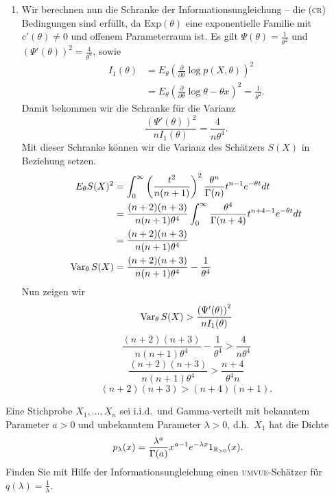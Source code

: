 \begin{enumerate}
    \item 
Wir berechnen nun die Schranke der Informationsungleichung -- die \textsc{(cr)}
Bedingungen sind erfüllt, da $\textrm{Exp}(\theta)$ eine exponentielle Familie
mit $c'(\theta)\neq 0$ und offenem Parameterraum ist. Es gilt
$\Psi(\theta)=\frac{1}{\theta^2}$ und $\left( \Psi'(\theta) \right)^2=
\frac{4}{\theta^6}$, sowie
\begin{align*}
    I_1(\theta) &= E_\theta \left( \frac{\partial}{\partial \theta} \log p(X, \theta) \right)^2 \\
    &= E_\theta \left( \frac{\partial}{\partial \theta} \log \theta -\theta x \right)^2 = \frac{1}{\theta^2}.
\end{align*}
Damit bekommen wir die Schranke für die Varianz
\begin{equation*}
    \frac{\left( \Psi'(\theta) \right)^2}{n I_1(\theta) } = \frac{4}{n \theta^4}.
\end{equation*}
Mit dieser Schranke können wir die Varianz des Schätzers $S(X)$ in Beziehung setzen.
\begin{align*}
    E_\theta S(X)^2 &= \int_{0}^{\infty} \left( \frac{t^2}{n(n+1)} \right)^2 \frac{\theta^n}{\Gamma(n)} t^{n-1} e^{-\theta t} dt \\
    &= \frac{(n+2)(n+3)}{n(n+1)\theta^4} \int_{0}^{\infty} \frac{\theta^4}{\Gamma(n+4)}t^{n+4-1} e^{-\theta t} dt \\
    &=  \frac{(n+2)(n+3)}{n(n+1)\theta^4} \\
    \operatorname{Var}_\theta S(X) &= \frac{(n+2)(n+3)}{n(n+1)\theta^4} - \frac{1}{\theta^4}
\end{align*}
Nun zeigen wir
\begin{equation*}
    \operatorname{Var}_\theta S(X) > \frac{\left( \Psi'(\theta) \right)^2}{n I_1(\theta) }
\end{equation*}
\begin{equation*}
    \frac{(n+2)(n+3)}{n(n+1)\theta^4} - \frac{1}{\theta^4} > \frac{4}{n \theta^4}
\end{equation*}
\begin{equation*}
    \frac{(n+2)(n+3)}{n(n+1)\theta^4} > \frac{n+4}{\theta^4 n}
\end{equation*}
\begin{equation*}
    (n+2)(n+3) > (n+4)(n+1).
\end{equation*}
\end{enumerate}






 Eine Stichprobe $X_1, \ldots, X_n$ sei i.i.d.\
und Gamma-verteilt mit bekanntem Parameter $a>0$ und unbekanntem Parameter 
$\lambda>0$, d.h.\ $X_1$ hat die Dichte
\begin{equation*}
    p_\lambda (x) = \frac{\lambda^a}{\Gamma(a)} x^{a-1}e^{-\lambda x} 1_{\mathbb R_{>0}}(x).
\end{equation*}
Finden Sie mit Hilfe der Informationsungleichung einen \textsc{umvue}-Schätzer für
$q(\lambda) = \frac{1}{\lambda}$.


